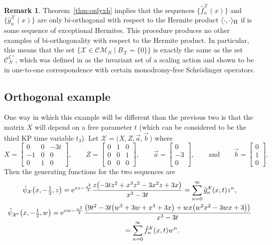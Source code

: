 \documentclass[pdftex]{sigma}
\numberwithin{equation}{section}
\theoremstyle{definition}
\newtheorem{Remark}[Theorem]{Remark}
\def\X{\mathcal{X}}
\def\CM{\mathcal{C\!M}}
\def\C{\mathbb{C}}
\def\ff{\hat f}
\def\gg{\hat g}
\begin{document}
 \begin{Remark}
 Theorem~\ref{thm:onlyxh} implies that the sequences $\big\{\ff_n^{\X}(x)\big\}$ and $\big\{\gg_n^{\X}(x)\big\}$ are only
bi-orthogonal with respect to the Hermite product
$\langle\cdot,\cdot\rangle_{\rm H}$ if
\smash{$\big\{\ff_n^{\X}(x)\big\}=\big\{\gg_n^{\X}(x)\big\}=\big\{\hat h_n^\lambda(x)\big\}$} is some
sequence of exceptional Hermites.
This procedure produces no other examples of bi-orthogonality with respect to
the Hermite product. In particular, this means that the
set $\{\X\in\CM_N\mid B_{\X}=\{0\}\}$ is
exactly the same as the set $\mathcal{C}_N^{\C^\times}$, which was defined in
\cite{ScaleInvar} as the invariant set of a scaling action and shown
to be in one-to-one correspondence with certain monodromy-free
Schr\"odinger operators.
\end{Remark}

\subsection{Orthogonal example}

One way in which this example will be different than the previous two is that the matrix $X$ will depend
on a free parameter $t$ (which can be considered to be the third KP
time variable $t_3$). Let $\X=\bigl(X,Z,\vec a,\vec b\,\bigr)$ where
\[
X=\left[\begin{matrix} 0 & 0 & -3 t \\
 -1 & 0 & 0 \\
 0 & 1 & 0\end{matrix}\right],
\qquad
Z=\left[\begin{matrix} 0 & 1 & 0 \\
 0 & 0 & 1 \\
 0 & 0 & 0 \end{matrix}\right],
\qquad
\vec a= \left[\begin{matrix} 0 \\
 -3 \\
 0 \end{matrix}\right],
\qquad\text{and}\qquad
\vec b=\left[\begin{matrix} 0 \\
 1 \\
 0 \end{matrix}\right].
\]
Then the generating functions for the two sequences are
\begin{gather*}
\hat\psi_{\X}\bigl(x,-\tfrac{1}{2},z\bigr)={\rm e}^{x z-\frac{z^2}{2}}\frac{z
 \bigl(-3 t z^2+x^3 z^2-3 x^2
 z+3 x\bigr)}{x^3-3 t}=\sum_{n=0}^{\infty}\gg_n^{\X}(x,t)z^n,
\\
\hat\psi_{\X^\flat}\bigl(x,-\tfrac{1}{2},w\bigr) ={\rm e}^{xw-\frac{w^2}{2}}\frac{
 \bigl(9 t^2-3 t \bigl(w^3+3
 w+x^3+3 x\bigr)+w x \bigl(w^2
 x^2-3 w
 x+3\bigr)\bigr)}{x^3-3 t}\\[-1mm]
\hphantom{\hat\psi_{\X^\flat}\bigl(x,-\tfrac{1}{2},w\bigr)}{} =\sum_{n=0}^{\infty}\ff_n^{\X}(x,t)w^n.
\end{gather*}
\end{document}
